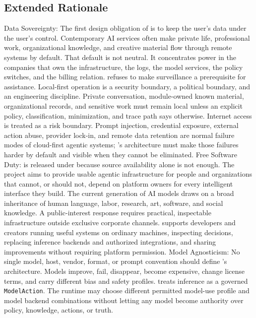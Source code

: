 \documentclass[11pt]{report}
\begin{document}
\subsection{Extended Rationale}
\begin{itemize}
	\itembf Data Sovereignty:
	\subitem The first design obligation of \Madre is to keep the user's data under the user's control. Contemporary AI services often make private life, professional work, organizational knowledge, and creative material flow through remote systems by default. That default is not neutral. It concentrates power in the companies that own the infrastructure, the logs, the model services, the policy switches, and the billing relation.
	\subitem \Madre refuses to make surveillance a prerequisite for assistance. Local-first operation is a security boundary, a political boundary, and an engineering discipline. Private conversation, module-owned known material, organizational records, and sensitive work must remain local unless an explicit policy, classification, minimization, and trace path says otherwise.
	\subitem Internet access is treated as a risk boundary. Prompt injection, credential exposure, external action abuse, provider lock-in, and remote data retention are normal failure modes of cloud-first agentic systems; \Madre's architecture must make those failures harder by default and visible when they cannot be eliminated.
	\itembf Free Software Duty:
	\subitem \Madre is released under \texttt{\license} because source availability alone is not enough. The project aims to provide usable agentic infrastructure for people and organizations that cannot, or should not, depend on platform owners for every intelligent interface they build.
	\subitem The current generation of AI models draws on a broad inheritance of human language, labor, research, art, software, and social knowledge. A public-interest response requires practical, inspectable infrastructure outside exclusive corporate channels.
	\subitem \Madre supports developers and creators running useful systems on ordinary machines, inspecting decisions, replacing inference backends and authorized integrations, and sharing improvements without requiring platform permission.
	\itembf Model Agnosticism:
	\subitem No single model, host, vendor, format, or prompt convention should define \Madre's architecture. Models improve, fail, disappear, become expensive, change license terms, and carry different bias and safety profiles.
	\subitem \Madre treats inference as a governed \texttt{ModelAction}. The runtime may choose different permitted model-use profile and model backend combinations without letting any model become authority over policy, knowledge, actions, or truth.

\end{itemize}
\end{document}
